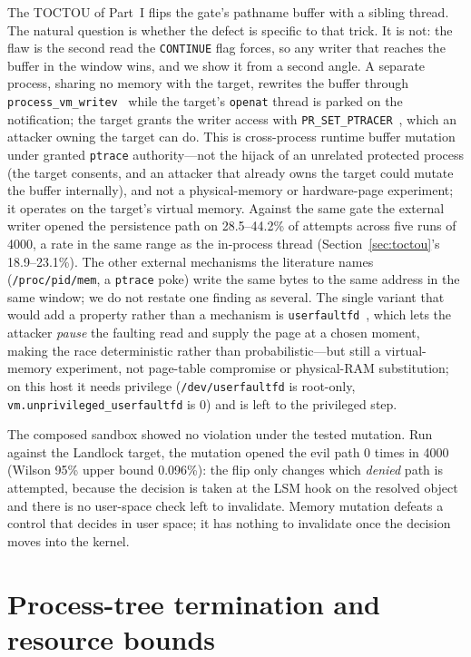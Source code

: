 \documentclass[11pt]{article}
\newcommand{\Nrace}{4000}
\newcommand{\RaceLo}{18.9}
\newcommand{\RaceHi}{23.1}
\begin{document}
The TOCTOU of Part~I flips the gate's pathname buffer with a sibling thread. The natural question is
whether the defect is specific to that trick. It is not: the flaw is the second read the \texttt{CONTINUE}
flag forces, so any writer that reaches the buffer in the window wins, and we show it from a second angle.
A separate process, sharing no memory with the target, rewrites the buffer through
\texttt{process\_vm\_writev}~\cite{procvmwritev} while the target's \texttt{openat} thread is parked on the
notification; the target grants the writer access with \texttt{PR\_SET\_PTRACER}~\cite{prctl}, which an
attacker owning the target can do. This is cross-process runtime buffer mutation under granted
\texttt{ptrace} authority---not the hijack of an unrelated protected process (the target consents, and an
attacker that already owns the target could mutate the buffer internally), and not a physical-memory or
hardware-page experiment; it operates on the target's virtual memory. Against the same gate the external
writer opened the persistence path on 28.5--44.2\% of attempts across five runs of \Nrace{}, a rate in the
same range as the in-process thread (Section~\ref{sec:toctou}'s \RaceLo--\RaceHi\%). The other external
mechanisms the literature names
(\texttt{/proc/pid/mem}, a \texttt{ptrace} poke) write the same bytes to the same address in the same
window; we do not restate one finding as several. The single variant that would add a property rather than
a mechanism is \texttt{userfaultfd}~\cite{userfaultfd}, which lets the attacker \emph{pause} the faulting
read and supply the page at a chosen moment, making the race deterministic rather than probabilistic---but
still a virtual-memory experiment, not page-table compromise or physical-RAM substitution; on this host it
needs privilege (\texttt{/dev/userfaultfd} is root-only, \texttt{vm.unprivileged\_userfaultfd} is 0) and is
left to the privileged step.

The composed sandbox showed no violation under the tested mutation. Run against the Landlock target,
the mutation opened the evil path 0 times in \Nrace{} (Wilson 95\% upper bound 0.096\%): the flip only
changes which \emph{denied} path is attempted, because the decision is taken at the LSM hook on the
resolved object and there is no user-space check left to invalidate. Memory mutation defeats a control that decides in user space; it has nothing to
invalidate once the decision moves into the kernel.

\section{Process-tree termination and resource bounds}\label{sec:killswitch}
\end{document}
